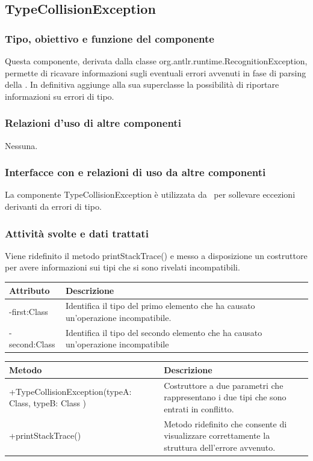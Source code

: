 \documentclass[11pt,titlepage,a4paper]{report}
\begin{document}
\subsection{TypeCollisionException}
\subsubsection{Tipo, obiettivo e funzione del componente}
Questa componente, derivata dalla classe org.antlr.runtime.RecognitionException, permette di ricavare informazioni sugli eventuali errori avvenuti in fase di parsing della \br. In definitiva aggiunge alla sua superclasse la possibilit\`a di riportare informazioni su errori di tipo.
\subsubsection{Relazioni d'uso di altre componenti}
Nessuna.
\subsubsection{Interfacce con e relazioni di uso da altre componenti}
La componente TypeCollisionException \`e utilizzata da \brp\ per sollevare eccezioni derivanti da errori di tipo.
\subsubsection{Attivit\`a svolte e dati trattati}
Viene ridefinito il metodo printStackTrace() e messo a disposizione un costruttore per avere informazioni sui tipi che si sono rivelati incompatibili.
\begin{center}
\begin{tabular}{||p{6cm}||p{6cm}||} \hline
\hline
Attributo & Descrizione \\  \hline
-first:Class & Identifica il tipo del primo elemento che ha causato un'operazione incompatibile. \\ \hline
-second:Class & Identifica il tipo del secondo elemento che ha causato un'operazione incompatibile \\ \hline
\end{tabular}
\end{center}
\begin{center}
\begin{tabular}{||p{6cm}||p{6cm}||} \hline
\hline
Metodo & Descrizione \\  \hline
+TypeCollisionException(typeA: Class, typeB: Class ) & Costruttore a due parametri che rappresentano i due tipi che sono entrati in conflitto.\\ \hline
+printStackTrace() & Metodo ridefinito che consente di visualizzare correttamente la struttura dell'errore avvenuto.\\ \hline
\end{tabular}
\end{center}
\end{document}
